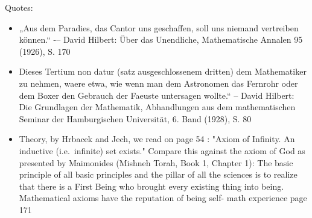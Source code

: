 \documentclass[hidelinks]{article}
\theoremstyle{plain}
\theoremstyle{definition}
\theoremstyle{rem}
\begin{document}
Quotes: 
\begin{itemize}
\item „Aus dem Paradies, das Cantor uns geschaffen, soll uns niemand vertreiben können.“ -– David Hilbert: Über das Unendliche, Mathematische Annalen 95 (1926), S. 170 
\item Dieses Tertium non datur (satz ausgeschlossenem dritten) dem Mathematiker zu nehmen, waere etwa, wie wenn man dem Astronomen das Fernrohr oder dem Boxer den Gebrauch der Faeuste untersagen wollte.“ – David Hilbert: Die Grundlagen der Mathematik, Abhandlungen aus dem mathematischen Seminar der Hamburgischen Universität, 6. Band (1928), S. 80
\item Theory, by Hrbacek and Jech, we read on page 54 :
	"Axiom of Infinity. An inductive (i.e.\ infinite) set exists." Compare this against the axiom of God as presented by Maimonides (Mishneh Torah, Book 1, Chapter 1): The basic principle of all basic principles and the pillar of all the sciences is to realize that there is a First Being who brought every existing thing into being.  Mathematical axioms have the reputation of being self- math experience page 171
\end{itemize}

\newpage


\end{document}
